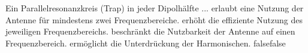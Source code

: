     {Ein Parallelresonanzkreis (Trap) in jeder Dipolhälfte ...}
    {erlaubt eine Nutzung der Antenne für mindestens zwei Frequenzbereiche.}
    {erhöht die effiziente Nutzung des jeweiligen Frequenzbereichs.}
    {beschränkt die Nutzbarkeit der Antenne auf einen Frequenzbereich.}
    {ermöglicht die Unterdrückung der Harmonischen.}
    {false}{false}